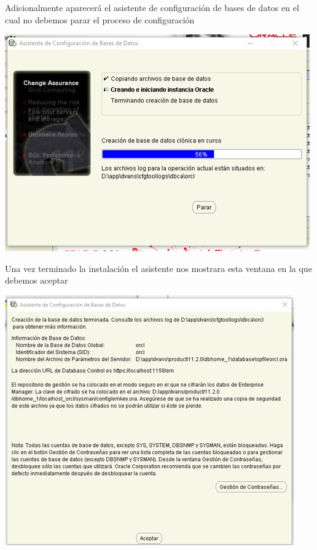 \begin{flushleft}
\begin{center}
\end{center}
Adicionalmente aparecerá el asistente de configuración de bases de datos en el cual no debemos parar el proceso de configuración\\
\begin{center}
\includegraphics{images/image-13}\\
\end{center}
Una vez terminado la instalación el asistente nos mostrara esta ventana en la que debemos aceptar\\
\begin{center}
\includegraphics{images/image-14}\\
\end{center}

\end{flushleft}
